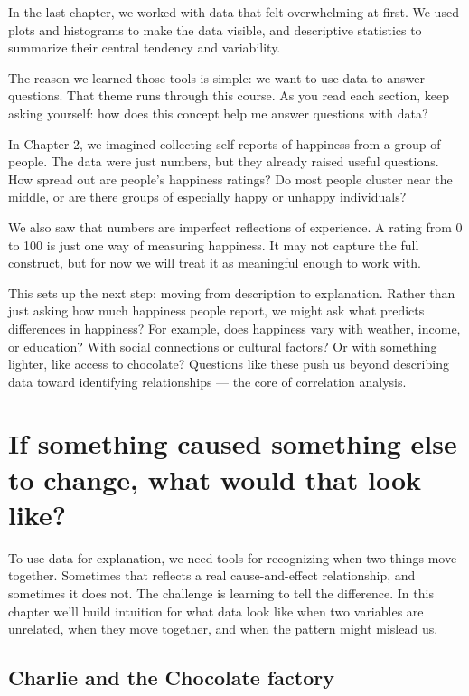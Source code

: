 \documentclass[
  letterpaper,
  DIV=11,
  numbers=noendperiod]{scrreprt}
\begin{document}
In the last chapter, we worked with data that felt overwhelming at
first. We used plots and histograms to make the data visible, and
descriptive statistics to summarize their central tendency and
variability.

The reason we learned those tools is simple: we want to use data to
answer questions. That theme runs through this course. As you read each
section, keep asking yourself: how does this concept help me answer
questions with data?

In Chapter 2, we imagined collecting self-reports of happiness from a
group of people. The data were just numbers, but they already raised
useful questions. How spread out are people's happiness ratings? Do most
people cluster near the middle, or are there groups of especially happy
or unhappy individuals?

We also saw that numbers are imperfect reflections of experience. A
rating from 0 to 100 is just one way of measuring happiness. It may not
capture the full construct, but for now we will treat it as meaningful
enough to work with.

This sets up the next step: moving from description to explanation.
Rather than just asking how much happiness people report, we might ask
what predicts differences in happiness? For example, does happiness vary
with weather, income, or education? With social connections or cultural
factors? Or with something lighter, like access to chocolate? Questions
like these push us beyond describing data toward identifying
relationships --- the core of correlation analysis.

\section{If something caused something else to change, what would that
look
like?}\label{if-something-caused-something-else-to-change-what-would-that-look-like}

To use data for explanation, we need tools for recognizing when two
things move together. Sometimes that reflects a real cause-and-effect
relationship, and sometimes it does not. The challenge is learning to
tell the difference. In this chapter we'll build intuition for what data
look like when two variables are unrelated, when they move together, and
when the pattern might mislead us.

\subsection{Charlie and the Chocolate
factory}\label{charlie-and-the-chocolate-factory}
\end{document}
